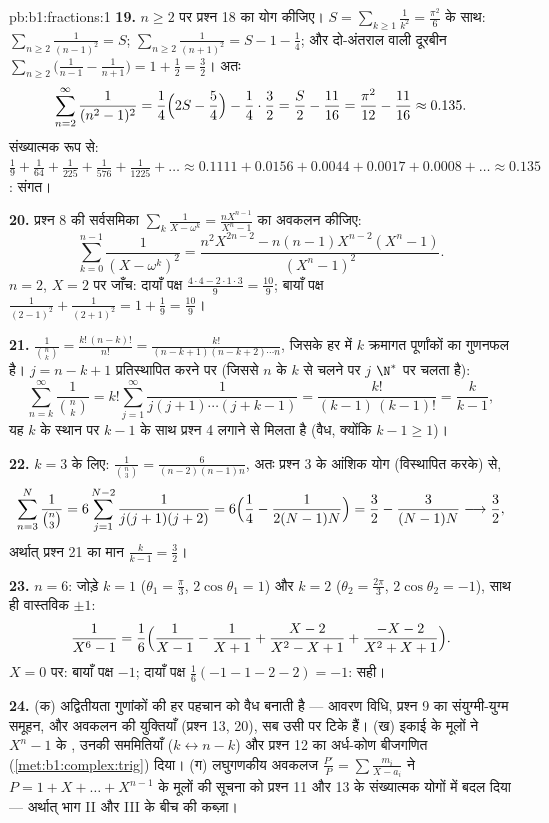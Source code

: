 \begin{solution}{pb:b1:fractions:1}
\textbf{19.} $n \geq 2$ पर प्रश्न 18 का योग कीजिए। $S =
\sum_{k\geq1}\frac1{k^2} = \frac{\pi^2}6$ के साथ: $\sum_{n\geq2}
\frac1{(n-1)^2} = S$; $\sum_{n\geq2}\frac1{(n+1)^2} = S - 1 - \frac14$; और
दो-अंतराल वाली दूरबीन $\sum_{n\geq2}\bigl( \frac1{n-1} - \frac1{n+1}\bigr) =
1 + \frac12 = \frac32$। अतः
\[
\sum_{n=2}^{\infty}\frac1{(n^2-1)^2}
= \frac14\Bigl(2S - \frac54\Bigr) - \frac14\cdot\frac32
= \frac S2 - \frac{11}{16}
= \frac{\pi^2}{12} - \frac{11}{16} \approx 0.135 .
\]
संख्यात्मक रूप से: $\frac19 + \frac1{64} + \frac1{225} + \frac1{576} +
\frac1{1225} + \dots \approx 0.1111 + 0.0156 + 0.0044 + 0.0017 + 0.0008 +
\dots \approx 0.135$: संगत।

\textbf{20.} प्रश्न 8 की सर्वसमिका $\sum_k\frac1{X-\omega^k} =
\frac{nX^{n-1}}{X^n-1}$ का अवकलन कीजिए:
\[
\sum_{k=0}^{n-1}\frac1{(X - \omega^k)^2}
= \frac{n^2X^{2n-2} - n(n-1)X^{n-2}(X^n - 1)}{(X^n - 1)^2} .
\]
$n = 2$, $X = 2$ पर जाँच: दायाँ पक्ष $\frac{4\cdot4 - 2\cdot1\cdot3}{9} =
\frac{10}9$; बायाँ पक्ष $\frac1{(2-1)^2} + \frac1{(2+1)^2} = 1 + \frac19 =
\frac{10}9$।

\textbf{21.} $\frac1{\binom nk} = \frac{k!\,(n-k)!}{n!} =
\frac{k!}{(n-k+1)(n-k+2)\cdots n}$, जिसके हर में $k$ क्रमागत पूर्णांकों का
गुणनफल है। $j = n - k + 1$ प्रतिस्थापित करने पर (जिससे $n$ के $k$ से चलने पर
$j$ $\N^*$ पर चलता है):
\[
\sum_{n=k}^{\infty}\frac1{\binom nk}
= k!\sum_{j=1}^{\infty}\frac1{j(j+1)\cdots(j+k-1)}
= \frac{k!}{(k-1)\,(k-1)!} = \frac{k}{k-1} ,
\]
यह $k$ के स्थान पर $k - 1$ के साथ प्रश्न 4 लगाने से मिलता है (वैध, क्योंकि
$k - 1 \geq 1$)।

\textbf{22.} $k = 3$ के लिए: $\frac1{\binom n3} = \frac6{(n-2)(n-1)n}$, अतः
प्रश्न 3 के आंशिक योग (विस्थापित करके) से,
\[
\sum_{n=3}^{N}\frac1{\binom n3}
= 6\sum_{j=1}^{N-2}\frac1{j(j+1)(j+2)}
= 6\Bigl(\frac14 - \frac1{2(N-1)N}\Bigr)
= \frac32 - \frac3{(N-1)N}
\longrightarrow \frac32 ,
\]
अर्थात् प्रश्न 21 का मान $\frac k{k-1} = \frac32$।

\textbf{23.} $n = 6$: जोड़े $k = 1$ ($\theta_1 = \frac\pi3$, $2\cos\theta_1
= 1$) और $k = 2$ ($\theta_2 = \frac{2\pi}3$, $2\cos\theta_2 = -1$), साथ ही
वास्तविक  $\pm1$:
\[
\frac1{X^6-1} = \frac16\Bigl(\frac1{X-1} - \frac1{X+1}
+ \frac{X - 2}{X^2 - X + 1}
+ \frac{-X - 2}{X^2 + X + 1}\Bigr) .
\]
$X = 0$ पर: बायाँ पक्ष $-1$; दायाँ पक्ष $\frac16(-1 - 1 - 2 - 2) = -1$: सही।

\textbf{24.} (क) अद्वितीयता गुणांकों की हर पहचान को वैध बनाती है --- आवरण
विधि, प्रश्न 9 का संयुग्मी-युग्म समूहन, और अवकलन की युक्तियाँ (प्रश्न 13,
20), सब उसी पर टिके हैं। (ख) इकाई के मूलों ने $X^n - 1$ के , उनकी
सममितियाँ ($k \leftrightarrow n-k$) और प्रश्न 12 का अर्ध-कोण बीजगणित
(\cref{met:b1:complex:trig}) दिया। (ग) लघुगणकीय अवकलज $\frac{P'}P =
\sum\frac{m_i}{X-a_i}$ ने $P = 1 + X + \dots + X^{n-1}$ के मूलों की सूचना को
प्रश्न 11 और 13 के संख्यात्मक योगों में बदल दिया --- अर्थात् भाग II और III
के बीच की कब्ज़ा।


\end{solution}
